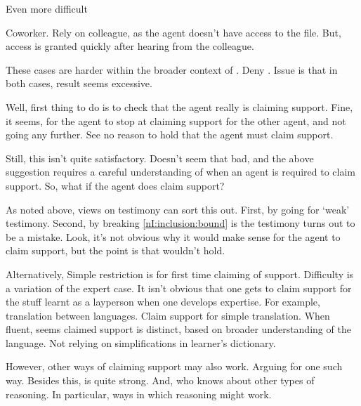 \begin{note}
  Even more difficult
\end{note}

\begin{note}
  Coworker.
  Rely on colleague, as the agent doesn't have access to the file.
  But, access is granted quickly after hearing from the colleague.
\end{note}

\begin{note}
  These cases are harder within the broader context of \nI{}.
  Deny \RBV{}.
  Issue is that in both cases, result seems excessive.

  Well, first thing to do is to check that the agent really is claiming support.
  Fine, it seems, for the agent to stop at claiming support for the other agent, and not going any further.
  See no reason to hold that the agent must claim support.

  Still, this isn't quite satisfactory.
  Doesn't seem that bad, and the above suggestion requires a careful understanding of when an agent is required to claim support.
  So, what if the agent does claim support?

  As noted above, views on testimony can sort this out.
  First, by going for `weak' testimony.
  Second, by breaking \ref{nI:inclusion:bound} is the testimony turns out to be a mistake.
  Look, it's not obvious why it would make sense for the agent to claim support, but the point is that \nI{} wouldn't hold.

  Alternatively, Simple restriction is for first time claiming of support.
  Difficulty is a variation of the expert case.
  It isn't obvious that one gets to claim support for the stuff learnt as a layperson when one develops expertise.
  For example, translation between languages.
  Claim support for simple translation.
  When fluent, seems claimed support is distinct, based on broader understanding of the language.
  Not relying on simplifications in learner's dictionary.

  However, other ways of claiming support may also work.
  Arguing for one such way.
  Besides this, \RBV{} is quite strong.
  And, who knows about other types of reasoning.
  In particular, ways in which reasoning \nr{} might work.
\end{note}

